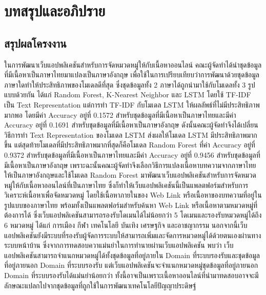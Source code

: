 \documentclass[12pt,oneside,openright,a4paper]{cpe-thai-project}
\begin{document}
\chapter{บทสรุปและอภิปราย}


\section{สรุปผลโครงงาน}
\hspace{1cm}ในการพัฒนาเว็บแอปพลิเคชันสำหรับการจัดหมวดหมู่ให้กับเนื้อหาออนไลน์ คณะผู้จัดทำได้นำชุดข้อมูลที่มีเนื้อหาเป็นภาษาไทยมาแปลงเป็นภาษาอังกฤษ
เพื่อใช้ในการเปรียบเทียบว่าการพัฒนาด้วยชุดข้อมูลภาษาใดทำให้ประสิทธิภาพของโมเดลดีที่สุด ซึ่งชุดข้อมูลทั้ง 2 ภาษาได้ถูกนำมาใช้กับโมเดลทั้ง 3 รูปแบบด้วยกัน ได้แก่
Random Forest, K-Nearest Neighbor และ LSTM โดยใช้ TF-IDF เป็น Text Representation แต่การทำ TF-IDF กับโมเดล LSTM ให้ผลลัพธ์ที่ไม่มีประสิทธิภาพมากพอ
โดยมีค่า Accuracy อยู่ที่ 0.1572 สำหรับชุดข้อมูลที่มีเนื้อหาเป็นภาษาไทยและมีค่า Accuracy อยู่ที่ 0.1691 สำหรับชุดข้อมูลที่มีเนื้อหาเป็นภาษาอังกฤษ 
ดังนั้นคณะผู้จัดทำจึงได้เปลี่ยนวิธีการทำ Text Representation ของโมเดล LSTM ส่งผลให้โมเดล LSTM มีประสิทธิภาพมากขึ้น แต่สุดท้ายโมเดลที่มีประสิทธิภาพมากที่สุดก็คือโมเดล
Random Forest ที่ค่า Accuracy อยู่ที่ 0.9372 สำหรับชุดข้อมูลที่มีเนื้อหาเป็นภาษาไทยและมีค่า Accuracy อยู่ที่ 0.9456 สำหรับชุดข้อมูลที่มีเนื้อหาเป็นภาษาอังกฤษ
เพราะฉะนั้นคณะผู้จัดทำจึงเลือกวิธีการแปลงเนื้อหาบทความจากภาษาไทยให้เป็นภาษาอังกฤษและใช้โมเดล Random Forest 
มาพัฒนาเว็บแอปพลิเคชันสําหรับการจัดหมวดหมู่ให้กับเนื้อหาออนไลน์ที่เป็นภาษาไทย ซึ่งก็ทำให้เว็บแอปพลิเคชันนี้เป็นแพลตฟอร์มสําหรับการวิเคราะห์เนื้อหาเพื่อจัดหมวดหมู่ 
โดยใช้เนื้อหาภายในของ Web Link หรือเนื้อหาของบทความที่อยู่ในรูปแบบของภาษาไทย พร้อมทั้งเป็นแพลตฟอร์มสําหรับค้นหา Web Link หรือเนื้อหาตามหมวดหมู่ที่ต้องการได้
ซึ่งเว็บแอปพลิเคชันสามารถรองรับโดเมนได้ไม่น้อยกว่า 5 โดเมนและรองรับหมวดหมู่ได้ถึง 6 หมวดหมู่ ได้แก่ การเมือง กีฬา เทคโนโลยี บันเทิง เศรษฐกิจ และอาชญากรรม
นอกจากนี้เว็บแอปพลิเคชันยังมีระบบที่รองรับผู้จัดการระบบให้สามารถเพิ่มและจัดการหมวดหมู่ได้ด้วยตนเองผ่านทางระบบหน้าบ้าน ซึ่งจากการทดสอบควาแม่นยำในการทำนายผ่านเว็บแอปพลิเคชัน
พบว่า เว็บแอปพลิเคชันสามารถจำแนกหมวดหมู่ได้ทั้งชุดข้อมูลที่อยู่ภายใน Domain ที่ระบบรองรับและชุดข้อมูลที่อยู่ภายนอก Domain ที่ระบบรองรับ 
แต่เว็บแอปพลิเคชันจะจำแนกหมวดหมู่ชุดข้อมูลที่อยู่ภายนอก Domain ที่ระบบรองรับได้แม่นยำน้อยกว่า 
ทั้งนี้อาจเป็นเพราะเนื้อหาออนไลน์ที่นำมาทดสอบอาจจะมีลักษณะแปลกไปจากชุดข้อมูลที่ถูกใช้ในการพัฒนาเทคโนโลยีปัญญาประดิษฐ์
\end{document}
